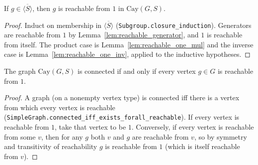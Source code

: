 \begin{lemma}
    \label{lem:reachable_of_mem_closure}
    \leanok
    If $g \in \overline{\langle S \rangle}$, then $g$ is reachable from $1$ in
    $\mathrm{Cay}(G,S)$.
\end{lemma}
\begin{proof}
    Induct on membership in $\overline{\langle S \rangle}$
    (\texttt{Subgroup.closure\_induction}). Generators are reachable from $1$ by
    Lemma~\ref{lem:reachable_generator}, and $1$ is reachable from itself. The product
    case is Lemma~\ref{lem:reachable_one_mul} and the inverse case is
    Lemma~\ref{lem:reachable_one_inv}, applied to the inductive hypotheses.
\end{proof}

\begin{lemma}
    \label{lem:connected_iff_reachable_one}
    \leanok
    The graph $\mathrm{Cay}(G,S)$ is connected if and only if every vertex $g \in G$
    is reachable from $1$.
\end{lemma}
\begin{proof}
    A graph (on a nonempty vertex type) is connected iff there is a vertex from which
    every vertex is reachable (\texttt{SimpleGraph.connected\_iff\_exists\_forall\_reachable}).
    If every vertex is reachable from $1$, take that vertex to be $1$. Conversely, if
    every vertex is reachable from some $v$, then for any $g$ both $v$ and $g$ are
    reachable from $v$, so by symmetry and transitivity of reachability $g$ is
    reachable from $1$ (which is itself reachable from $v$).
\end{proof}

